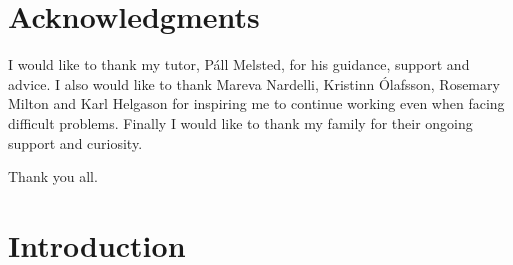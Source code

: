 \documentclass[a4paper,12pt,twoside,BCOR=10mm]{scrbook}
\begin{document}
\chapter*{Acknowledgments}


%
%
%
%
% 

I would like to thank my tutor, Páll Melsted, for his guidance, support and advice. 
I also would like to thank Mareva Nardelli, Kristinn Ólafsson, Rosemary Milton and Karl Helgason 
for inspiring me to continue working even when facing difficult problems. 
Finally I would like to thank my family for their ongoing support and curiosity.

Thank you all.

\chapter{Introduction}
\setcounter{page}{1}

\end{document}
